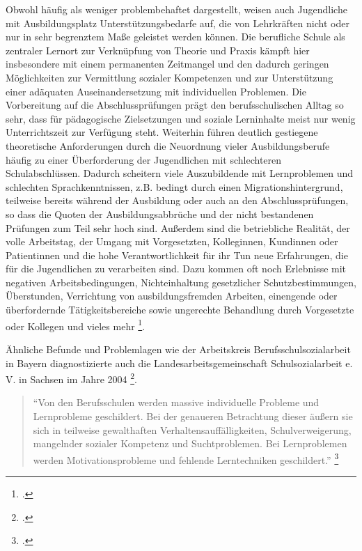 Obwohl häufig als weniger problembehaftet dargestellt, weisen auch Jugendliche mit Ausbildungsplatz Unterstützungsbedarfe auf, die von Lehrkräften nicht oder nur in sehr begrenztem Maße geleistet werden können. Die berufliche Schule als zentraler Lernort zur Verknüpfung von Theorie und Praxis kämpft hier insbesondere mit einem permanenten Zeitmangel und den dadurch geringen Möglichkeiten zur Vermittlung sozialer Kompetenzen und zur Unterstützung einer adäquaten Auseinandersetzung mit individuellen Problemen. Die Vorbereitung auf die Abschlussprüfungen prägt den berufsschulischen Alltag so sehr, dass für pädagogische Zielsetzungen und soziale Lerninhalte meist nur wenig Unterrichtszeit zur Verfügung steht. Weiterhin führen deutlich gestiegene theoretische Anforderungen durch die Neuordnung vieler Ausbildungsberufe häufig zu einer Überforderung der Jugendlichen mit schlechteren Schulabschlüssen. Dadurch scheitern viele Auszubildende mit Lernproblemen und schlechten Sprachkenntnissen, z.B. bedingt durch einen Migrationshintergrund, teilweise bereits während der Ausbildung oder auch an den Abschlussprüfungen, so dass die Quoten der Ausbildungsabbrüche und der nicht bestandenen Prüfungen zum Teil sehr hoch sind. Außerdem sind die betriebliche Realität, der volle Arbeitstag, der Umgang mit Vorgesetzten, Kolleginnen, Kundinnen oder Patientinnen und die hohe Verantwortlichkeit für ihr Tun neue Erfahrungen, die für die Jugendlichen zu verarbeiten sind. Dazu kommen oft noch Erlebnisse mit negativen Arbeitsbedingungen, Nichteinhaltung gesetzlicher Schutzbestimmungen, Überstunden, Verrichtung von ausbildungsfremden Arbeiten, einengende oder überfordernde Tätigkeitsbereiche sowie ungerechte Behandlung durch Vorgesetzte oder Kollegen und vieles mehr \footcite[vgl.][7]{ASSB2011}. 
 
Ähnliche Befunde und Problemlagen wie der Arbeitskreis Berufsschulsozialarbeit in Bayern diagnostizierte auch die Landesarbeitsgemeinschaft Schulsozialarbeit e. V. in Sachsen im Jahre 2004 \footcite[18]{LSS2004}. 

\begin{quotation}
\noindent
"`Von den Berufsschulen werden massive individuelle Probleme und Lernprobleme geschildert. Bei der genaueren Betrachtung dieser äußern sie sich in teilweise gewalthaften Verhaltensauffälligkeiten, Schulverweigerung, mangelnder sozialer Kompetenz und Suchtproblemen. Bei Lernproblemen werden Motivationsprobleme und fehlende Lerntechniken geschildert."' \footcite[18]{LSS2004}
\end{quotation}

